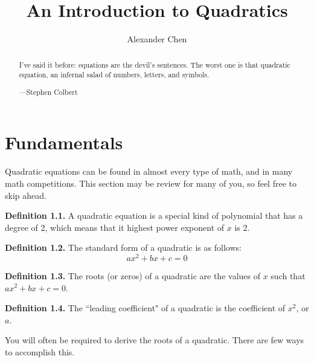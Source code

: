 \documentclass{article}
\title{An Introduction to Quadratics}
\author{Alexander Chen}
\begin{document}
\maketitle

\begin{abstract}
  I've said it before: equations are the devil's sentences. The worst one is that quadratic equation, an infernal salad of numbers, letters, and symbols.

  \medskip

  ---Stephen Colbert
\end{abstract}


\section{Fundamentals}
Quadratic equations can be found in almost every type of math, and in many math competitions. This section may be review for many of you, so feel free to skip ahead.
\begin{mdframed}
  \textbf{Definition 1.1.} A quadratic equation is a special kind of polynomial that has a degree of 2, which means that it highest power exponent of $x$ is 2.
\end{mdframed}
\begin{mdframed}
  \textbf{Definition 1.2.} The standard form of a quadratic is as follows:
  $$ax^2+bx+c=0$$
\end{mdframed}
\begin{mdframed}
  \textbf{Definition 1.3.} The roots (or zeros) of a quadratic are the values of $x$ such that $ax^2+bx+c=0$.
\end{mdframed}
\begin{mdframed}
  \textbf{Definition 1.4.} The ``leading coefficient" of a quadratic is the coefficient of $x^2$, or $a$.
\end{mdframed}
You will often be required to derive the roots of a quadratic. There are few ways to accomplish this.
\end{document}
